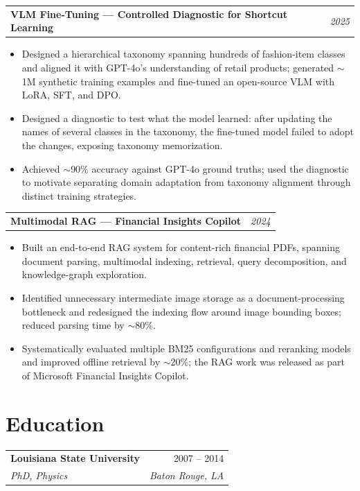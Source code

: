 \documentclass[10pt,letterpaper]{article}
\makeatletter
\newcommand{\resumeSubheading}[4]{%
\vspace{1pt}
\begin{tabularx}{\textwidth}{@{}Xr@{}}
\textbf{#1} & #2 \\
\textit{#3} & \textit{#4}
\end{tabularx}
\vspace{-3pt}}
\newcommand{\researchHeading}[2]{%
\vspace{5pt}
\begin{tabularx}{\textwidth}{@{}Xr@{}}
\textbf{#1} & \textit{#2}
\end{tabularx}
\vspace{-10pt}}
\makeatother
\begin{document}
\researchHeading {VLM Fine-Tuning --- Controlled Diagnostic for Shortcut Learning}{2025}
\begin{itemize}
\item Designed a hierarchical taxonomy spanning hundreds of fashion-item classes and aligned it with GPT-4o's understanding of retail products; generated $\sim$1M synthetic training examples and fine-tuned an open-source VLM with LoRA, SFT, and DPO.
\item Designed a diagnostic to test what the model learned: after updating the names of several classes in the taxonomy, the fine-tuned model failed to adopt the changes, exposing taxonomy memorization.
\item Achieved $\sim$90\% accuracy against GPT-4o ground truths; used the diagnostic to motivate separating domain adaptation from taxonomy alignment through distinct training strategies.
\end{itemize}

\researchHeading{Multimodal RAG --- Financial Insights Copilot}{2024}
\begin{itemize}
\item Built an end-to-end RAG system for content-rich financial PDFs, spanning document parsing, multimodal indexing, retrieval, query decomposition, and knowledge-graph exploration.
\item Identified unnecessary intermediate image storage as a document-processing bottleneck and redesigned the indexing flow around image bounding boxes; reduced parsing time by $\sim$80\%.
\item Systematically evaluated multiple BM25 configurations and reranking models and improved offline retrieval by $\sim$20\%; the RAG work was released as part of Microsoft Financial Insights Copilot.
\end{itemize}

\section{Education}
\resumeSubheading{Louisiana State University}{2007 -- 2014}{PhD, Physics}{Baton Rouge, LA}
\end{document}

